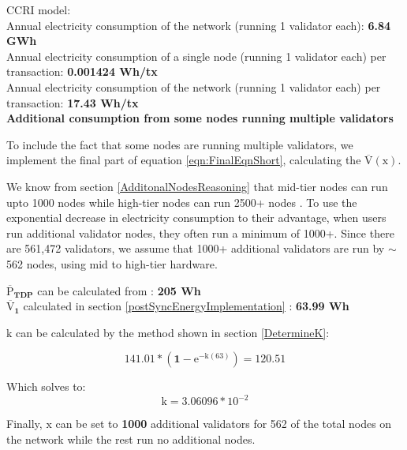 CCRI model: \\
Annual electricity consumption of the network (running 1 validator each): \textbf{6.84 GWh} \\
Annual electricity consumption of a single node (running 1 validator each) per transaction: \textbf{0.001424 Wh/tx} \\
Annual electricity consumption of the network (running 1 validator each) per transaction: \textbf{17.43 Wh/tx} \\

\textbf{Additional consumption from some nodes running multiple validators}

To include the fact that some nodes are running multiple validators, we implement the final part of equation \ref{eqn:FinalEqnShort}, calculating the $\boldsymbol{\mathrm{\overline{V}(\mathrm{x})}}$. 

We know from section \ref{AdditonalNodesReasoning} that mid-tier nodes can run upto 1000 nodes while high-tier nodes can run 2500+ nodes \cite{2021HardwareEthstaker} \cite{Kaushal2022ValidatingConference}. To use the exponential decrease in electricity consumption to their advantage, when users run additional validator nodes, they often run a minimum of 1000+. Since there are 561,472 validators, we assume that 1000+ additional validators are run by $\sim$562 nodes, using mid to high-tier hardware.   

$\boldsymbol{\mathrm{\overline{P}}_{TDP}}$ can be calculated from : \textbf{205 Wh} \\
$\boldsymbol{ \overline{\mathrm{V}}_{1}}$ calculated in section \ref{postSyncEnergyImplementation} : \textbf{63.99 Wh} 

$\boldsymbol{\mathrm{k}}$ can be calculated by the method shown in section \ref{DetermineK}:

\begin{equation*}
    \boldsymbol{\mathrm{141.01} * (1-\mathrm{e}^{-\mathrm{k}(\mathrm{63})}) = \mathrm{120.51}}
\end{equation*}

Which solves to:
\begin{equation*}
    \boldsymbol{\mathrm{k} = \mathrm{{3.06096} * {10}^{-2}}}
\end{equation*}

Finally, $\boldsymbol{\mathrm{x}}$ can be set to \textbf{1000} additional validators for 562 of the total nodes on the network while the rest run no additional nodes.

